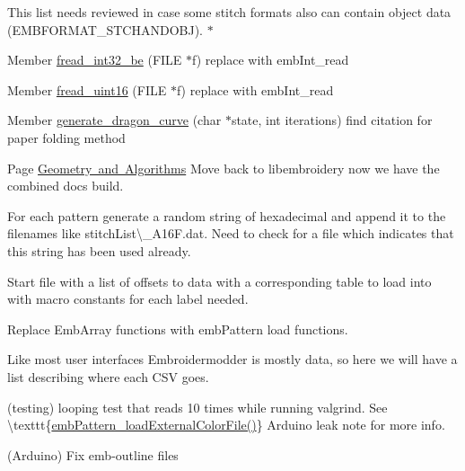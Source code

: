 \begin{DoxyRefList}
%
This list needs reviewed in case some stitch formats also can contain object data (EMBFORMAT\+\_\+\+STCHANDOBJ). $\ast$  
\item[Member \mbox{\hyperlink{formats_8c_a05fb50e7292226bc2947dd2b4da7a9bd}{fread\+\_\+int32\+\_\+be}} (FILE $\ast$f)]\label{todo__todo000218}%
%
replace with emb\+Int\+\_\+read  
\item[Member \mbox{\hyperlink{formats_8c_a2bcdb1e6bf6930d5c054ecdca9831eba}{fread\+\_\+uint16}} (FILE $\ast$f)]\label{todo__todo000217}%
%
replace with emb\+Int\+\_\+read  
\item[Member \mbox{\hyperlink{fill_8c_ad02b5d945eacff708d2bf084c40044d8}{generate\+\_\+dragon\+\_\+curve}} (char $\ast$state, int iterations)]\label{todo__todo000211}%
%
find citation for paper folding method  
\item[Page \mbox{\hyperlink{geometry-and-algorithms}{Geometry and Algorithms}} ]\label{todo__todo000203}%
%
Move back to libembroidery now we have the combined docs build.

\label{todo__todo000202}%
%
For each pattern generate a random string of hexadecimal and append it to the filenames like {\ttfamily stitch\+List\textbackslash{}\+\_\+\+A16\+F.\+dat}. Need to check for a file which indicates that this string has been used already.

\label{todo__todo000201}%
%
Start file with a list of offsets to data with a corresponding table to load into with macro constants for each label needed.

\label{todo__todo000200}%
%
Replace Emb\+Array functions with emb\+Pattern load functions.

\label{todo__todo000199}%
%
Like most user interfaces Embroidermodder is mostly data, so here we will have a list describing where each CSV goes.

\label{todo__todo000198}%
%
(testing) looping test that reads 10 times while running valgrind. See \textbackslash{}texttt\{\mbox{\hyperlink{embroidery_8h_a3bf191bd99e2da8d36465f454a4646f6}{emb\+Pattern\+\_\+load\+External\+Color\+File()}}\} Arduino leak note for more info.

\label{todo__todo000193}%
%
(Arduino) Fix emb-\/outline files


\end{DoxyRefList}
